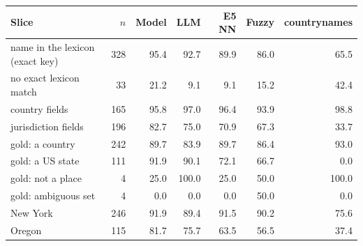 \begin{tabular}{l r rrrrr}
\toprule
Slice & $n$ & Model & LLM & E5 NN & Fuzzy & countrynames \\
\midrule
name in the lexicon (exact key) & 328 & 95.4 & 92.7 & 89.9 & 86.0 & 65.5 \\
no exact lexicon match & 33 & 21.2 & 9.1 & 9.1 & 15.2 & 42.4 \\
country fields & 165 & 95.8 & 97.0 & 96.4 & 93.9 & 98.8 \\
jurisdiction fields & 196 & 82.7 & 75.0 & 70.9 & 67.3 & 33.7 \\
gold: a country & 242 & 89.7 & 83.9 & 89.7 & 86.4 & 93.0 \\
gold: a US state & 111 & 91.9 & 90.1 & 72.1 & 66.7 & 0.0 \\
gold: not a place & 4 & 25.0 & 100.0 & 25.0 & 50.0 & 100.0 \\
gold: ambiguous set & 4 & 0.0 & 0.0 & 0.0 & 50.0 & 0.0 \\
New York & 246 & 91.9 & 89.4 & 91.5 & 90.2 & 75.6 \\
Oregon & 115 & 81.7 & 75.7 & 63.5 & 56.5 & 37.4 \\
\bottomrule
\end{tabular}
